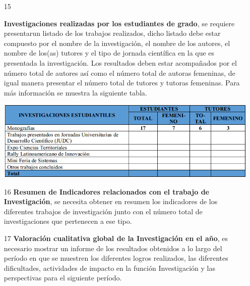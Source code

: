 \documentclass[12pt,letterpaper]{report}
\newcommand{\mb}{\vspace{0.5cm}}
\begin{document}
\begin{itemize}
\item[15]{
\textbf{Investigaciones realizadas por los estudiantes de grado}, se requiere presentarun listado de los trabajos realizados, dicho listado debe estar compuesto por el nombre de la investigación, el nombre de los autores, el nombre de los(as) tutores y el tipo de jornada científica en la que es presentada la investigación. Los resultados deben estar acompañados por el número total de autores así como el número total de autoras femeninas, de igual manera presentar el número total de tutores y tutoras femeninas. Para más información se muestra la siguiente tabla.

\mb
\centering
	\includegraphics[width=\textwidth]{img/tabla15.png}\par
\mb 
}


\item[16]{
\textbf{Resumen de Indicadores relacionados con el trabajo de Investigación}, se necesita obtener en resumen los indicadores de los diferentes trabajos de investigación junto con el número total de investigaciones que pertenecen a ese tipo.
}


\item[17]{
\textbf{Valoración cualitativa global de la Investigación en el año}, es necesario mostrar un informe de los resultados obtenidos a lo largo del período en que se muestren los diferentes logros realizados, las diferentes dificultades, actividades de impacto en la función Investigación y las perspectivas para el siguiente período.
}
\end{itemize}
\end{document}
